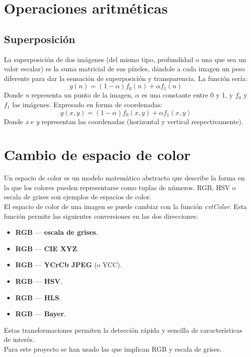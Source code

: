 \section{Operaciones aritméticas}
\subsection{Superposición}
La superposición de dos imágenes (del mismo tipo, profundidad o una
que sea un valor escalar) es la suma matricial de sus píxeles, dándole
a cada imagen un peso diferente para dar la sensación de superposición
y transparencia. La función sería:
\begin{equation*}
  g(n) = (1 - \alpha)f_0(n) + \alpha f_1(n)
\end{equation*}
Donde \emph{n} representa un punto de la imagen, \emph{$\alpha$} es
una constante entre 0 y 1, y \emph{$f_0$} y \emph{$f_1$} las imágenes.
Expresado en forma de coordenadas:
\begin{equation*}
  g(x, y) = (1 - \alpha)f_0(x, y) + \alpha f_1(x, y)
\end{equation*}
Donde \emph{x} e \emph{y} representan las coordenadas (horizontal y
vertical respectivamente).


\section{Cambio de espacio de color}
Un espacio de color es un modelo matemático abstracto que describe la
forma en la que los colores pueden representarse como tuplas de
números. RGB, HSV o escala de grises son ejemplos de espacios de color. \\
El espacio de color de una imagen se puede cambiar con la función
\emph{cvtColor}.  Esta función permite las siguientes conversiones en
las dos direcciones:
\begin{itemize}
\item \textbf{RGB} --- \textbf{escala de grises}.
\item \textbf{RGB} --- \textbf{CIE XYZ}.
\item \textbf{RGB} --- \textbf{YCrCb JPEG} (o YCC).
\item \textbf{RGB} --- \textbf{HSV}.
\item \textbf{RGB} --- \textbf{HLS}.
\item \textbf{RGB} --- \textbf{Bayer}.
\end{itemize}
Estas transformaciones permiten la detección rápida y sencilla de
características
de interés. \\
Para este proyecto se han usado las que implican RGB y escala de
grises.


